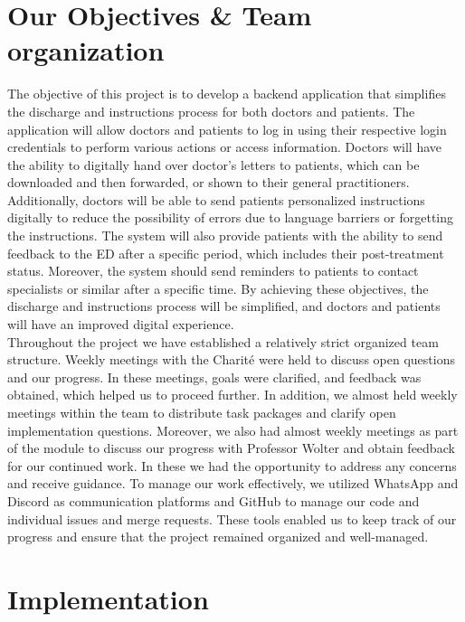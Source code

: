 \documentclass[]{report}
\begin{document}
\section{Our Objectives \& Team organization}
The objective of this project is to develop a backend application that simplifies the discharge and instructions process for both doctors and patients. The application will allow doctors and patients to log in using their respective login credentials to perform various actions or access information. Doctors will have the ability to digitally hand over doctor's letters to patients, which can be downloaded and then forwarded, or shown to their general practitioners. Additionally, doctors will be able to send patients personalized instructions digitally to reduce the possibility of errors due to language barriers or forgetting the instructions. The system will also provide patients with the ability to send feedback to the ED after a specific period, which includes their post-treatment status. Moreover, the system should send reminders to patients to contact specialists or similar after a specific time. By achieving these objectives, the discharge and instructions process will be simplified, and doctors and patients will have an improved digital experience.\\
Throughout the project we have established a relatively strict organized team structure. Weekly meetings with the Charité were held to discuss open questions and our progress. In these meetings, goals were clarified, and feedback was obtained, which helped us to proceed further. In addition, we almost held weekly meetings within the team to distribute task packages and clarify open implementation questions. Moreover, we also had almost weekly meetings as part of the module to discuss our progress with Professor Wolter and obtain feedback for our continued work. In these we had the opportunity to address any concerns and receive guidance. To manage our work effectively, we utilized WhatsApp and Discord as communication platforms and GitHub to manage our code and individual issues and merge requests. These tools enabled us to keep track of our progress and ensure that the project remained organized and well-managed.

\section{Implementation}
\end{document}
